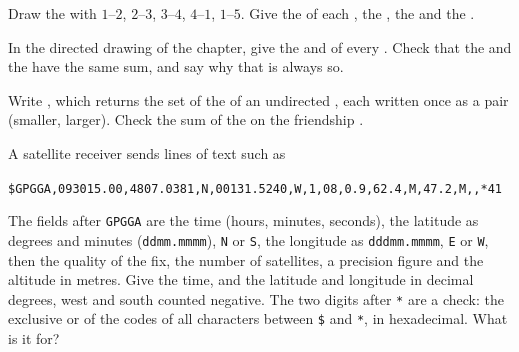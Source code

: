 \begin{exercise}[$\star\star$]\label{exo:g10:graphs-first-look:8}
Draw the  with  $1$--$2$, $2$--$3$, $3$--$4$, $4$--$1$, $1$--$5$. Give the  of each ,
the , the  and the .
\end{exercise}

\begin{exercise}[$\star\star$]\label{exo:g10:graphs-first-look:9}
In the directed drawing of the chapter, give the  and  of every . Check that the 
and the  have the same sum, and say why that is always so.
\end{exercise}

\begin{exercise}[$\star\star$]\label{exo:g10:graphs-first-look:10}
Write , which returns the set of the  of an undirected , each written once as a
pair (smaller, larger). Check the sum of the  on the friendship .
\end{exercise}

\begin{exercise}[$\star\star$]\label{exo:g10:graphs-first-look:11}
A satellite receiver sends lines of text such as

\smallskip\noindent\hspace*{1em}\texttt{\$GPGGA,093015.00,4807.0381,N,00131.5240,W,1,08,0.9,62.4,M,47.2,M,,*41}

\smallskip\noindent The fields after \texttt{GPGGA} are the time (hours, minutes, seconds), the latitude as degrees
and minutes (\texttt{ddmm.mmmm}), \texttt{N} or \texttt{S}, the longitude as \texttt{dddmm.mmmm}, \texttt{E} or
\texttt{W}, then the quality of the fix, the number of satellites, a precision figure and the altitude in metres. Give the time, and the latitude
and longitude in decimal degrees, west and south counted negative. The two digits after \texttt{*} are a check: the
exclusive or of the codes of all characters between \texttt{\$} and \texttt{*}, in hexadecimal. What is it for?
\end{exercise}

